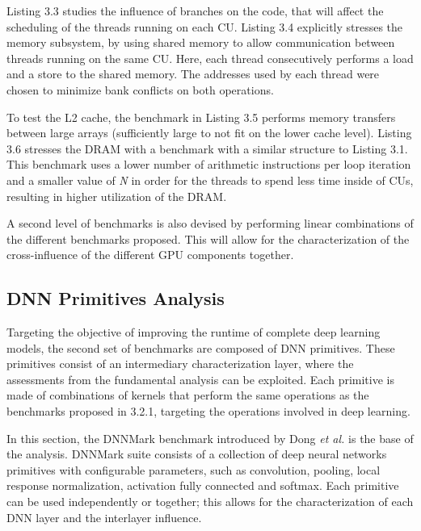 Listing 3.3 studies the influence of branches on the code, that will affect the scheduling of the threads running on each CU. Listing 3.4 explicitly stresses the memory subsystem, by using shared memory to allow communication between threads running on the same CU. Here, each thread consecutively performs a load and a store to the shared memory. The addresses used by each thread were chosen to minimize bank conflicts on both operations.

To test the L2 cache, the benchmark in Listing 3.5 performs memory transfers between large arrays (sufficiently large to not fit on the lower cache level). Listing 3.6 stresses the DRAM with a benchmark with a similar structure to Listing 3.1. This benchmark uses a lower number of arithmetic instructions per loop iteration and a smaller value of \textit{N} in order for the threads to spend less time inside of CUs, resulting in higher utilization of the DRAM.

A second level of benchmarks is also devised by performing linear combinations of the different benchmarks proposed. This will allow for the characterization of the cross-influence of the different GPU components together.





\subsection{DNN Primitives Analysis}
\label{sec:dnnPri}

Targeting the objective of improving the runtime of complete deep learning models, the second set of benchmarks are composed of DNN primitives. These primitives consist of an intermediary characterization layer, where the assessments from the fundamental analysis can be exploited. Each primitive is made of combinations of kernels that perform the same operations as the benchmarks proposed in 3.2.1, targeting the operations involved in deep learning. 

In this section, the DNNMark benchmark introduced by Dong \textit{et al.} \cite{dong_dnnmark:_2017} is the base of the analysis. DNNMark suite consists of a collection of deep neural networks primitives with configurable parameters, such as convolution, pooling, local response normalization, activation fully connected and softmax. Each primitive can be used independently or together; this allows for the characterization of each DNN layer and the interlayer influence.


